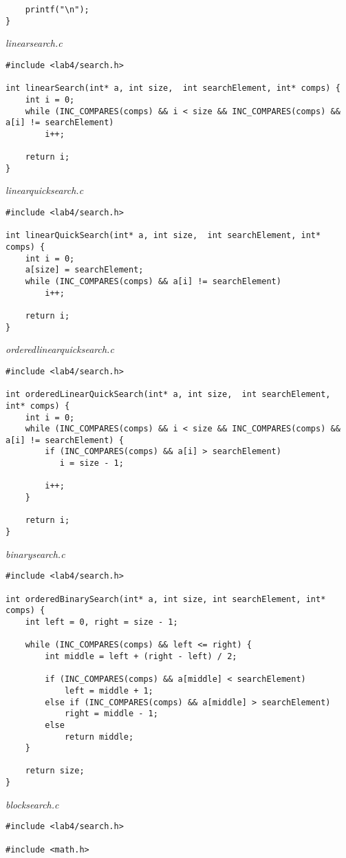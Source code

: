 \documentclass[a4paper,14pt]{extarticle}
\begin{document}
\begin{enumerate}
\begin{verbatim}
    printf("\n");
}
	\end{verbatim}
	      \textit{linearsearch.c}
	      \begin{verbatim}
#include <lab4/search.h>

int linearSearch(int* a, int size,  int searchElement, int* comps) {
    int i = 0;
    while (INC_COMPARES(comps) && i < size && INC_COMPARES(comps) && a[i] != searchElement)
        i++;

    return i;
}
	\end{verbatim}
	      \textit{linearquicksearch.c}
	      \begin{verbatim}
#include <lab4/search.h>

int linearQuickSearch(int* a, int size,  int searchElement, int* comps) {
    int i = 0;
    a[size] = searchElement;
    while (INC_COMPARES(comps) && a[i] != searchElement)
        i++;

    return i;
}
	\end{verbatim}
	      \textit{orderedlinearquicksearch.c}
	      \begin{verbatim}
#include <lab4/search.h>

int orderedLinearQuickSearch(int* a, int size,  int searchElement, int* comps) {
    int i = 0;
    while (INC_COMPARES(comps) && i < size && INC_COMPARES(comps) && a[i] != searchElement) {
        if (INC_COMPARES(comps) && a[i] > searchElement)
           i = size - 1;
        
        i++;
    }

    return i;
}
	\end{verbatim}
	      \textit{binarysearch.c}
	      \begin{verbatim}
#include <lab4/search.h>

int orderedBinarySearch(int* a, int size, int searchElement, int* comps) {
    int left = 0, right = size - 1;

    while (INC_COMPARES(comps) && left <= right) {
        int middle = left + (right - left) / 2;

        if (INC_COMPARES(comps) && a[middle] < searchElement) 
            left = middle + 1;
        else if (INC_COMPARES(comps) && a[middle] > searchElement)
            right = middle - 1;
        else
            return middle;
    }
    
    return size;
}
	\end{verbatim}
	      \textit{blocksearch.c}
	      \begin{verbatim}
#include <lab4/search.h>

#include <math.h>


\end{verbatim}
\end{enumerate}
\end{document}
